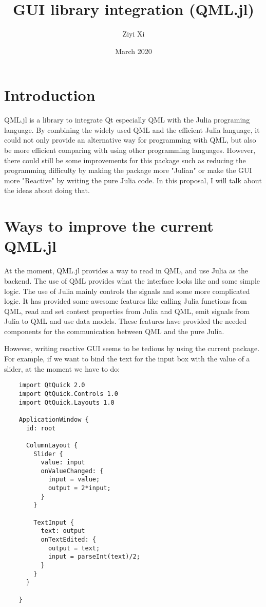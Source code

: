 \documentclass[12pt]{extarticle}
\title{GUI library integration (QML.jl)}
\author{Ziyi Xi}
\date{March 2020}
\begin{document}
\maketitle

\section{Introduction}
QML.jl is a library to integrate Qt especially QML with the Julia programing language. By combining the widely used QML and the efficient Julia language, it 
could not only provide an alternative way for programming with QML, but also be more efficient comparing with using other programming languages. However, there could still be 
some improvements for this package such as reducing the programming difficulty by making the package more "Julian" or make the GUI more "Reactive" by writing the pure
Julia code. In this proposal, I will talk about the ideas about doing that.

\section{Ways to improve the current QML.jl}

At the moment, QML.jl provides a way to read in QML, and use Julia as the backend. The use of QML 
provides what the interface looks like and some simple logic. The use of Julia mainly controls the signals and some more complicated
logic. It has provided some awesome features like calling Julia functions from QML, read and set context properties from Julia and QML,
emit signals from Julia to QML and use data models. These features have provided the needed components for the communication between QML 
and the pure Julia.

However, writing reactive GUI seems to be tedious by using the current package. For example, if we want to bind the text
for the input box with the value of a slider, at the moment we have to do:

\begin{verbatim}
    import QtQuick 2.0
    import QtQuick.Controls 1.0
    import QtQuick.Layouts 1.0
    
    ApplicationWindow {
      id: root
    
      ColumnLayout {    
        Slider {
          value: input
          onValueChanged: {
            input = value;
            output = 2*input;
          }
        }
    
        TextInput {
          text: output
          onTextEdited: {
            output = text;
            input = parseInt(text)/2;
          }
        }
      }
    
    }
\end{verbatim}
\end{document}
